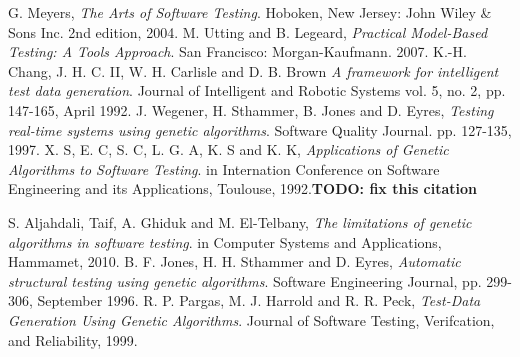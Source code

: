\documentclass[runningheads]{llncs}
\begin{document}
\newpage
\begin{thebibliography}{9}

  G. Meyers,
  \emph{The Arts of Software Testing}.
  Hoboken, New Jersey: John Wiley \& Sons Inc.
  2nd edition,
   2004.
  M. Utting and B. Legeard,
  \emph{Practical Model-Based Testing: A Tools Approach}.
  San Francisco: Morgan-Kaufmann.
   2007.
  	K.-H. Chang, J. H. C. II, W. H. Carlisle and D. B. Brown
  \emph{A framework for intelligent test data generation}.
  Journal of Intelligent and Robotic Systems
  vol. 5, 
  no. 2, 
  pp. 147-165, 
  April 1992.
  	J. Wegener, H. Sthammer, B. Jones and D. Eyres,
  \emph{Testing real-time systems using genetic algorithms}.
  Software Quality Journal.
  pp. 127-135, 
  1997.    
  X. S, E. C, S. C, L. G. A, K. S and K. K,
  \emph{Applications of Genetic Algorithms to Software Testing}.
  in Internation Conference on Software Engineering and its Applications, 
  Toulouse, 
  1992.\textbf{TODO: fix this citation}
  
  	S. Aljahdali, Taif, A. Ghiduk and M. El-Telbany,
  \emph{The limitations of genetic algorithms in software testing}.
  in Computer Systems and Applications, 
  Hammamet, 
  2010. 
  	B. F. Jones, H. H. Sthammer and D. Eyres,
  \emph{Automatic structural testing using genetic algorithms}.
  Software Engineering Journal, 
  pp. 299-306, 
  September 1996.  
  	R. P. Pargas, M. J. Harrold and R. R. Peck,
  \emph{Test-Data Generation Using Genetic Algorithms}.
  Journal of Software Testing, Verifcation, and Reliability, 
  1999.      
\end{thebibliography}
\end{document}
